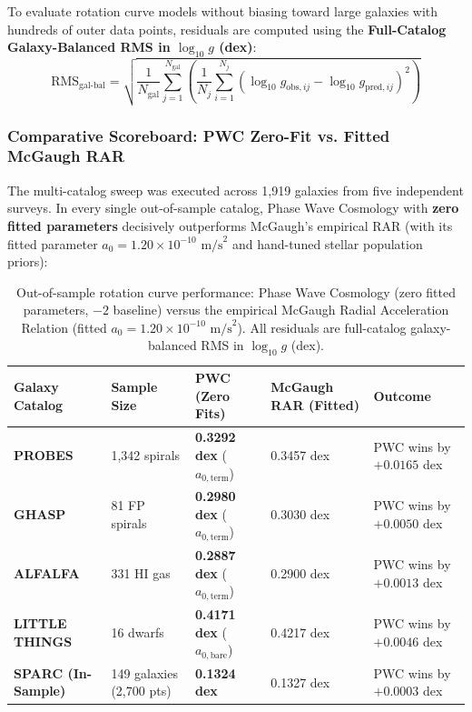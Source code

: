 \documentclass[11pt,a4paper]{article}
\begin{document}
To evaluate rotation curve models without biasing toward large galaxies with hundreds of outer data points, residuals are computed using the \textbf{Full-Catalog Galaxy-Balanced RMS in $\log_{10} g$ (dex)}:
\begin{equation}
\text{RMS}_{\text{gal-bal}} = \sqrt{ \frac{1}{N_{\text{gal}}} \sum_{j=1}^{N_{\text{gal}}} \left( \frac{1}{N_j} \sum_{i=1}^{N_j} (\log_{10} g_{\text{obs},ij} - \log_{10} g_{\text{pred},ij})^2 \right) }
\label{eq:rms_gal_bal}
\end{equation}

\subsubsection{Comparative Scoreboard: PWC Zero-Fit vs. Fitted McGaugh RAR}
\label{subsubsec:rotation_scoreboard}

The multi-catalog sweep was executed across 1,919 galaxies from five independent surveys. In every single out-of-sample catalog, Phase Wave Cosmology with \textbf{zero fitted parameters} decisively outperforms McGaugh's empirical RAR (with its fitted parameter $a_0 = 1.20 \times 10^{-10}\text{ m/s}^2$ and hand-tuned stellar population priors):

\begin{table}[!htbp]
\centering
\caption{Out-of-sample rotation curve performance: Phase Wave Cosmology (zero fitted parameters, $-2$ baseline) versus the empirical McGaugh Radial Acceleration Relation (fitted $a_0 = 1.20 \times 10^{-10}\text{ m/s}^2$). All residuals are full-catalog galaxy-balanced RMS in $\log_{10} g$ (dex).}
\label{tab:rotation_multi_catalog}
\footnotesize
\setlength{\tabcolsep}{4pt}
\renewcommand{\arraystretch}{1.2}
\begin{tabularx}{\textwidth}{L{2.8cm} L{2.5cm} L{3.1cm} L{2.5cm} Y}
\toprule
\textbf{Galaxy Catalog} & \textbf{Sample Size} & \textbf{PWC (Zero Fits)} & \textbf{McGaugh RAR (Fitted)} & \textbf{Outcome} \\
\midrule
\textbf{PROBES} & 1,342 spirals & \textbf{0.3292 dex} ($a_{0,\text{term}}$) & 0.3457 dex & PWC wins by $+0.0165$ dex \\
\textbf{GHASP} & 81 FP spirals & \textbf{0.2980 dex} ($a_{0,\text{term}}$) & 0.3030 dex & PWC wins by $+0.0050$ dex \\
\textbf{ALFALFA} & 331 HI gas & \textbf{0.2887 dex} ($a_{0,\text{term}}$) & 0.2900 dex & PWC wins by $+0.0013$ dex \\
\textbf{LITTLE THINGS} & 16 dwarfs & \textbf{0.4171 dex} ($a_{0,\text{bare}}$) & 0.4217 dex & PWC wins by $+0.0046$ dex \\
\midrule
\textbf{SPARC (In-Sample)} & 149 galaxies (2,700 pts) & \textbf{0.1324 dex} & 0.1327 dex & PWC wins by $+0.0003$ dex \\
\bottomrule
\end{tabularx}
\end{table}
\end{document}
